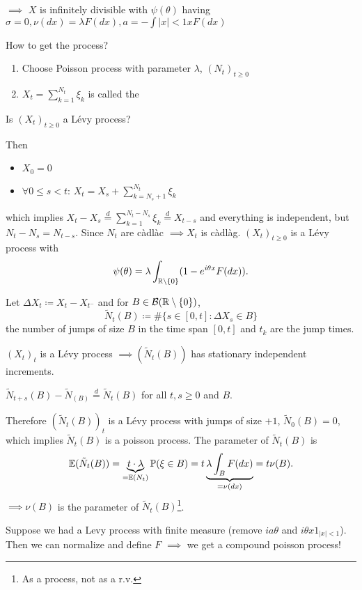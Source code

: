 $\implies$ $X$ is infinitely divisible with $\psi(\theta)$ having $\sigma=0,\nu(dx)=\lambda F(dx),a=-\int{|x|<1} x F(dx)$

How to get the process?
\begin{enumerate}
    \item Choose Poisson process with parameter $\lambda$, $(N_t)_{t\geq 0}$
    \item $X_t=\sum_{k=1}^{N_t}\xi_k$ is called the 
\end{enumerate}

Is $(X_t)_{t\geq 0}$ a Lévy process?

Then \begin{itemize}
    \item $X_0=0$
    \item $\forall 0\leq s<t$: $X_t=X_s+\sum_{k=N_s+1}^{N_t}\xi_k$ 
\end{itemize}
which implies $X_t-X_s\stackrel{d}{=}\sum_{k=1}^{N_t-N_s}\xi_k\stackrel{d}{=}X_{t-s}$ and everything is independent, but 
$N_t-N_s=N_{t-s}$.
Since $N_t$ are càdlàc $\implies X_t$ is càdlàg. $(X_t)_{t\geq 0}$ is a Lévy process with 
\[\psi(\theta)=\lambda \int_{\mathbb{R}\setminus\{0\}}(1-e^{i\theta x}F(dx)).\]

Let $\Delta X_t\coloneqq X_t-X_{t^-}$ and for $B\in\mathcal{B}(\mathbb{R}\setminus\{0\})$,
\[\tilde{N}_t(B)\coloneqq \#\{s\in[0,t]:\Delta X_{s}\in B\}\]
the number of jumps of size $B$ in the time span $[0,t]$ and $t_k$ are the jump times.

$(X_t)_t$ is a Lévy process $\implies (\tilde{N}_t(B))$ has stationary independent increments.

$\tilde{N}_{t+s}(B)-\tilde{N}_(B)\stackrel{d}{=}\tilde{N}_t(B)$ for all $t,s\geq 0$ and $B$.

Therefore $(\tilde{N}_t(B))_t$ is a Lévy process with jumps of size $+1$, $\tilde{N}_0(B)=0$, which implies $\tilde{N}_t(B)$ is a poisson process.
The parameter of $\tilde{N}_t(B)$ is \[\mathbb{E}(\tilde{N}_t(B))=\underbrace{t\cdot \lambda}_{=\mathbb{E}(N_t)}\mathbb{P}(\xi\in B)=t\underbrace{\lambda\int_B F(dx)}_{=\nu(dx)}=t\nu(B).\]
$\implies \nu(B)$ is the parameter of $\tilde{N}_t(B)$\footnote{As a process, not as a r.v.}.

\begin{aremark}
    Suppose we had a Levy process with finite measure (remove $ia\theta$ and $i\theta x1_{|x|<1}$). Then we can 
    normalize and define $F$ $\implies$ we get a compound poisson process!
\end{aremark}


